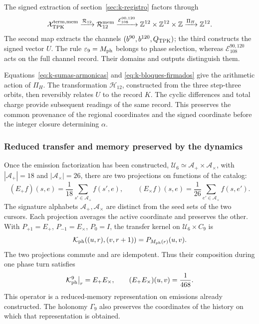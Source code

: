 The signed extraction of section~\ref{sec:k-registro} factors through
\begin{equation}
 \mathcal X_{\rm TPK}^{\rm term,mem}
 \xrightarrow{\mathcal R_{12}}\mathcal R_{12}^{\rm mem}
 \xrightarrow{\mathcal E_{108}^{90,120}}
 \mathbb Z^{12}\times\mathbb Z^{12}\times\mathbb Z
 \xrightarrow{\Pi_H}\mathbb Z^{12}.
 \label{ii:tpk-extraccion-tipada}
\end{equation}
The second map extracts the channels
\((b^{90},b^{120},Q_{\rm TPK})\); the third constructs the signed
vector \(U\). The rule \(\varepsilon_9=M_{\rm ph}\) belongs to
phase selection, whereas \(\mathcal E_{108}^{90,120}\) acts on
the full channel record. Their domains and outputs distinguish them.

Equations~\eqref{eq:k-sumas-armonicas} and
\eqref{eq:k-bloques-firmados} give the arithmetic action of \(\Pi_H\).
The transformation \(\mathcal H_{12}\), constructed from the
three step-three orbits, then reversibly relates \(U\) to the
record \(K\). The cyclic differences and total charge provide
subsequent readings of the same record. This preserves the common
provenance of the regional coordinates and the signed coordinate before the
integer closure determining \(\alpha\).

\subsubsection{Reduced transfer and memory preserved by the dynamics}

Once the emission factorization has been constructed,
\(\mathcal U_6\simeq\mathcal A_+\times\mathcal A_\times\), with
\(|\mathcal A_+|=18\) and \(|\mathcal A_\times|=26\), there are
two projections on functions of the catalog:
\[
 (E_+f)(s,e)=\frac1{18}\sum_{s'\in\mathcal A_+}f(s',e),\qquad
 (E_\times f)(s,e)=\frac1{26}\sum_{e'\in\mathcal A_\times}f(s,e').
\]
The signature alphabets \(\mathcal A_+,\mathcal A_\times\) are
distinct from the seed sets of the two cursors.
Each projection averages the active coordinate and preserves the other. With
\(P_{+1}=E_+\), \(P_{-1}=E_\times\), \(P_0=I\), the transfer
kernel on \(\mathcal U_6\times C_9\) is
\[
 \mathcal K_{\rm ph}((u,r),(v,r+1))=P_{M_{\rm ph}(r)}(u,v).
\]
The two projections commute and are idempotent. Thus their composition
during one phase turn satisfies
\begin{equation}
 \mathcal K_{\rm ph}^{9}\big|_r=E_+E_\times,\qquad
 (E_+E_\times)(u,v)=\frac1{468}.
 \label{ii:tpk-renovacion}
\end{equation}
This operator is a reduced-memory representation on emissions already
constructed. The holonomy \(\Gamma_9\) also preserves the
coordinates of the history on which that representation is obtained.

